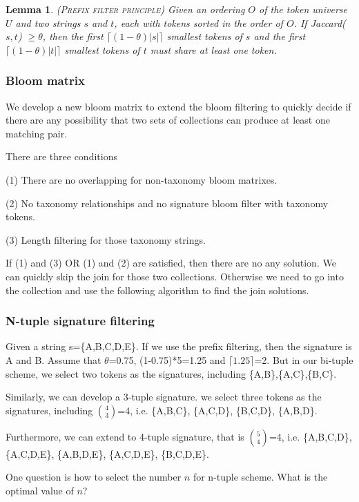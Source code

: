 \documentclass{sig-alternate}
\newtheorem{lem}[theorem]{Lemma}
\renewcommand{\geq}{\geqslant}
\begin{document}
\begin{lem} (\textsc{Prefix filter principle}) \cite{conf/icde/ChaudhuriGK06} Given an
ordering $O$ of the token universe $U$ and two strings $s$ and $t$, each with tokens sorted in the
order of $O$.   If Jaccard($s, t$) $\geq \theta$, then the first $\lceil(1-\theta)|s|\rceil$ smallest
tokens of $s$ and the first $\lceil(1-\theta)|t|\rceil$ smallest
tokens of $t$  must share at least one token.
\end{lem}

\subsubsection{Bloom matrix}

We develop a new bloom matrix to extend the bloom filtering to quickly decide if there are any possibility that two sets of collections can produce at least one matching pair.

There are three conditions

(1) There are no overlapping for non-taxonomy bloom matrixes.

(2) No taxonomy relationships and no signature bloom filter with taxonomy tokens.

(3) Length filtering for those taxonomy strings.

If (1) and (3) OR (1) and (2) are satisfied, then there are no any solution. We can quickly skip the join for those two collections. Otherwise we need to go into the collection and use the following algorithm to find the join solutions.


\subsubsection{N-tuple signature filtering}


Given a string s=\{A,B,C,D,E\}. If we use the prefix filtering, then the signature is A and B. Assume that $\theta$=0.75, (1-0.75)*5=1.25 and $\lceil 1.25 \rceil$=2. But in our bi-tuple scheme, we select two tokens as the signatures, including \{A,B\},\{A,C\},\{B,C\}. 

Similarly, we can develop a 3-tuple signature. we select three tokens as the signatures, including $\binom{4}{3}$=4, i.e. \{A,B,C\}, \{A,C,D\}, \{B,C,D\}, \{A,B,D\}.

Furthermore, we can extend to 4-tuple signature, that is $\binom{5}{4}$=4, i.e. \{A,B,C,D\}, \{A,C,D,E\}, \{A,B,D,E\}, \{A,C,D,E\}, \{B,C,D,E\}.

One question is how to select the number $n$ for n-tuple scheme. What is the optimal value of $n$?
\end{document}
